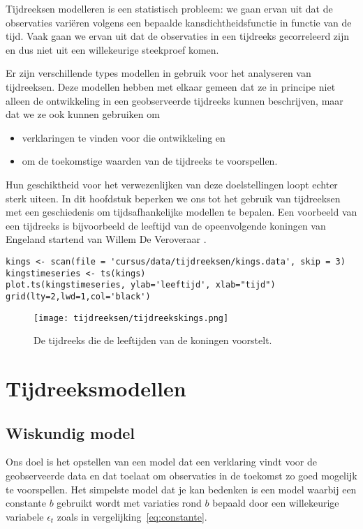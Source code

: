 Tijdreeksen modelleren is een statistisch probleem: we gaan ervan uit dat de observaties variëren volgens een bepaalde kansdichtheidsfunctie in functie van de tijd. Vaak gaan we ervan uit dat de observaties in een tijdreeks gecorreleerd zijn en dus niet uit een willekeurige steekproef komen. 

Er zijn verschillende types modellen in gebruik voor het analyseren van tijdreeksen. Deze modellen hebben met elkaar gemeen dat ze in principe niet alleen de ontwikkeling in een geobserveerde tijdreeks kunnen beschrijven, maar dat we ze ook kunnen gebruiken om

\begin{itemize}
	\item verklaringen te vinden voor die ontwikkeling en
	\item om de toekomstige waarden van de tijdreeks te voorspellen.
\end{itemize}

Hun geschiktheid voor het verwezenlijken van deze doelstellingen loopt echter sterk uiteen. In dit hoofdstuk beperken we ons tot het gebruik van tijdreeksen met een geschiedenis om tijdsafhankelijke modellen te bepalen. Een voorbeeld van een tijdreeks is bijvoorbeeld de leeftijd van de opeenvolgende koningen van Engeland startend van Willem De Veroveraar \autocite{Hipel1994}.

\begin{lstlisting}
kings <- scan(file = 'cursus/data/tijdreeksen/kings.data', skip = 3)
kingstimeseries <- ts(kings)
plot.ts(kingstimeseries, ylab='leeftijd', xlab="tijd")
grid(lty=2,lwd=1,col='black')
\end{lstlisting}

\begin{figure}
	\centering
	\texttt{[image: tijdreeksen/tijdreekskings.png]}
	\caption{De tijdreeks die de leeftijden van de koningen voorstelt.}
	\label{fig:tijdreeks11}
\end{figure}

\section{Tijdreeksmodellen}

\subsection{Wiskundig model}

Ons doel is het opstellen van een model dat een verklaring vindt voor de geobserveerde data en dat toelaat om observaties in de toekomst zo goed mogelijk te voorspellen. Het simpelste model dat je kan bedenken is een model waarbij een constante $b$ gebruikt wordt met variaties rond $b$ bepaald door een willekeurige variabele $\epsilon_{t}$ zoals in vergelijking~\ref{eq:constante}. 

